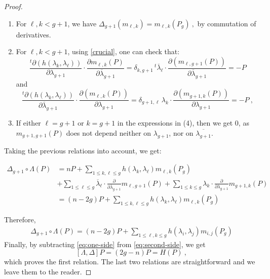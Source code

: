 \documentclass[10pt,a4paper]{amsart}
\begin{document}
\begin{proof}
\begin{enumerate}
    \item For $\ell,k<g+1$, we have $\Delta_{g+1}(m_{\ell,k})=m_{\ell,k}(P_g)~,$ by commutation of derivatives.
    \item For $\ell,k<g+1$, using \cref{crucial}, one can check that:
    \[{\frac{^t\partial \left( h(\lambda_k,\lambda_\ell)\right)}{\partial \lambda_{g+1}}} \cdot \frac{\partial m_{\ell,k}(P)}{\partial \overline{\lambda}_{g+1}}=\delta_{k,g+1}  \, {^t\overline{\lambda}_\ell}\cdot \frac{\partial (m_{\ell,g+1}(P))}{\partial \overline{\lambda}_{g+1}}=-P\]
    and 
    \[{\frac{^t\partial(h(\lambda_k,\lambda_\ell))}{\partial \overline{\lambda}_{g+1}}}\cdot \frac{\partial(m_{\ell,k}(P))}{\partial \lambda_{g+1}}=\delta_{g+1,\ell}\, \lambda_k\cdot \frac{\partial (m_{g+1,k}(P))}{\partial \lambda_{g+1}}=-P~,\]
    \item If either $\ell=g+1$ or $k=g+1$ in the expressions in (4), then we get $0$, as $m_{g+1,g+1}(P)$ does not depend neither on $\lambda_{g+1}$, nor on $\overline{\lambda_{g+1}}$.
 \end{enumerate}

  Taking the previous relations into account, we get: 
  
       \begin{align*}
        \Delta_{g+1}\circ\Lambda( P)&= nP+\sum_{1\leq k,\ell\leq g}h(\lambda_k,\lambda_\ell)m_{\ell,k}(P_g)\\
        &+\sum_{1\leq \ell\leq g}\overline{\lambda}_\ell\cdot \frac{\partial}{\partial \overline{\lambda}_{g+1}}m_{\ell,g+1}(P)+\sum_{1\leq k\leq g}\lambda_k\cdot \frac{\partial}{\partial \lambda_{g+1}}m_{g+1,k}(P) \\
        &=(n-2g)P+\sum_{1\leq k,\ell\leq g}h(\lambda_k,\lambda_\ell)m_{\ell,k}(P_g)
   \end{align*}
 
Therefore,
\begin{align}\label{eq:one-side}
     \Delta_{g+1}\circ\Lambda(P)=(n-2g)P+\sum_{1\leq \ell,k\leq g}h(\lambda_i,\lambda_j)m_{i,j}(P_g)
\end{align}
   Finally, by subtracting \cref{eq:one-side} from \cref{eq:second-side}, we get
   \[[\Lambda,\Delta]P=(2g-n)P =H(P)~,\]
which proves the first relation. The last two relations are straightforward and we leave them to the reader.
\end{proof}
\end{document}
